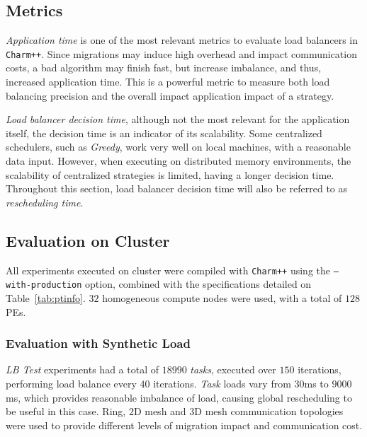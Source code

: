 \subsection{Metrics}

\textit{Application time} is one of the most relevant metrics to evaluate load balancers in \texttt{Charm++}.
Since migrations may induce high overhead and impact communication costs, a bad algorithm may finish fast, but increase imbalance, and thus, increased application time.
This is a powerful metric to measure both load balancing precision and the overall impact application impact of a strategy.

\textit{Load balancer decision time}, although not the most relevant for the application itself, the decision time is an indicator of its scalability.
Some centralized schedulers, such as \textit{Greedy}, work very well on local machines, with a reasonable data input.
However, when executing on distributed memory environments, the scalability of centralized strategies is limited, having a longer decision time.
Throughout this section, load balancer decision time will also be referred to as \textit{rescheduling time}.

\subsection{Evaluation on Cluster} \label{sec:cluster}

All experiments executed on cluster were compiled with \texttt{Charm++} using the \texttt{--with-production} option, combined with the specifications detailed on Table~\ref{tab:ptinfo}.
$32$ homogeneous compute nodes were used, with a total of $128$ PEs.

\subsubsection{Evaluation with Synthetic Load} \label{sec:cluster:lbtest}

\textit{LB Test} experiments had a total of $18990$ \textit{tasks}, executed over $150$ iterations, performing load balance every $40$ iterations.
\textit{Task} loads vary from $30$ms to $9000$ms, which provides reasonable imbalance of load, causing global rescheduling to be useful in this case.
Ring, $2$D mesh and $3$D mesh communication topologies were used to provide different levels of migration impact and communication cost.

